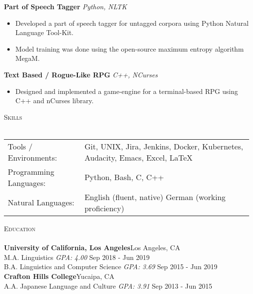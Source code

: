 \documentclass[]{article}
\newcommand{\lineunder} {
    \vspace*{-8pt} \\
    \hspace*{-18pt} \hrulefill \\
}
\newcommand{\header} [1] {
    {\hspace*{-18pt}\vspace*{6pt} \textsc{#1}}
    \vspace*{-6pt} \lineunder
}
\begin{document}
{\textbf{Part of Speech Tagger}} \hspace*{5mm} {\sl Python, NLTK} \\
\vspace*{-5pt}\begin{itemize}	\itemsep 0pt
	\item Developed a part of speech tagger for untagged corpora using Python Natural Language Tool-Kit.
	\item Model training was done using the open-source maximum entropy algorithm MegaM.
\end{itemize}
\vspace*{0mm}
{\textbf{Text Based / Rogue-Like RPG}} \hspace*{5mm} {\sl C++, NCurses} \\
\vspace*{-5pt}\begin{itemize}	\itemsep 0pt
	\item Designed and implemented a game-engine for a terminal-based RPG using C++ and nCurses library.
\end{itemize}
\vspace*{0mm}

\header{Skills}
\begin{tabular}{ l p{11.2cm} }
	Tools / Environments:  & Git, UNIX, Jira, Jenkins, Docker, Kubernetes, Audacity, Emacs, Excel, \LaTeX
	\\
	Programming Languages: & Python, Bash, C, C++
	\\
	Natural Languages:     & English \hfill (fluent, native) \newline German \hfill (working proficiency)
	\\
\end{tabular}
\vspace{2mm}


\header{Education}
\textbf{University of California, Los Angeles}\hfill Los Angeles, CA\\
M.A. Linguistics \hspace*{36mm} \textit{GPA: 4.00} \hfill Sep 2018 - Jun 2019\\
\vspace{1mm}
B.A. Linguistics and Computer Science \hspace*{1mm} \textit{GPA: 3.69} \hfill Sep 2015 - Jun 2019\\
\vspace{1mm}
\textbf{Crafton Hills College}\hfill Yucaipa, CA\\
A.A. Japanese Language and Culture \hspace*{3.8mm} \textit{GPA: 3.91} \hfill Sep 2013 - Jun 2015\\
\vspace{1mm}
\end{document}
